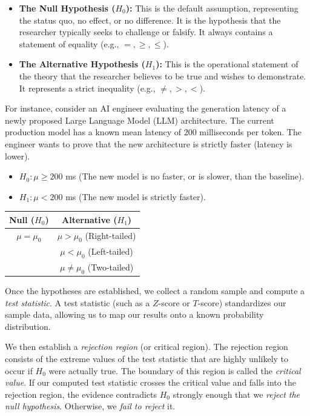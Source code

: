 \documentclass{article}
\begin{document}
\begin{itemize}
    \item \textbf{The Null Hypothesis ($H_0$):} This is the default assumption, representing the status quo, no effect, or no difference. It is the hypothesis that the researcher typically seeks to challenge or falsify. It always contains a statement of equality (e.g., $=, \geq, \leq$).
    \item \textbf{The Alternative Hypothesis ($H_1$):} This is the operational statement of the theory that the researcher believes to be true and wishes to demonstrate. It represents a strict inequality (e.g., $\neq, >, <$).
\end{itemize}

For instance, consider an AI engineer evaluating the generation latency of a newly proposed Large Language Model (LLM) architecture. The current production model has a known mean latency of $200$ milliseconds per token. The engineer wants to prove that the new architecture is strictly faster (latency is lower). 
\begin{itemize}
    \item $H_0: \mu \geq 200$ ms (The new model is no faster, or is slower, than the baseline).
    \item $H_1: \mu < 200$ ms (The new model is strictly faster).
\end{itemize}

\begin{margintable}
\centering
\begin{tabular}{|| c c ||} 
 \hline
 Null ($H_0$) & Alternative ($H_1$) \\ [0.5ex] 
 \hline\hline
 $\mu = \mu_0$   & $\mu > \mu_0$ (Right-tailed) \\
         & $\mu < \mu_0$ (Left-tailed) \\
         & $\mu \neq \mu_0$ (Two-tailed) \\ [1ex] 
 \hline
\end{tabular}
\captionsetup{justification=centering}
\caption{\label{tab:hypotheses} Null Hypothesis \& Possible Alternative Hypotheses.}
\end{margintable}

Once the hypotheses are established, we collect a random sample and compute a \emph{test statistic}. A test statistic (such as a $Z$-score or $T$-score) standardizes our sample data, allowing us to map our results onto a known probability distribution. 

We then establish a \emph{rejection region} (or critical region). The rejection region consists of the extreme values of the test statistic that are highly unlikely to occur if $H_0$ were actually true. The boundary of this region is called the \emph{critical value}. If our computed test statistic crosses the critical value and falls into the rejection region, the evidence contradicts $H_0$ strongly enough that we \emph{reject the null hypothesis}. Otherwise, we \emph{fail to reject} it. 
\end{document}

